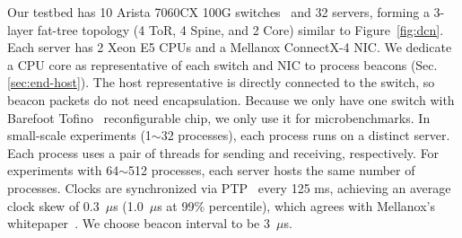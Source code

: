 Our testbed has 10 Arista 7060CX 100G switches~\cite{arista} and 32 servers, forming a 3-layer fat-tree topology (4 ToR, 4 Spine, and 2 Core) similar to Figure~\ref{fig:dcn}.
Each server has 2 Xeon E5 CPUs and a Mellanox ConnectX-4 NIC. %
We dedicate a CPU core as representative of each switch and NIC to process beacons (Sec.\ref{sec:end-host}). The host representative is directly connected to the switch, so beacon packets do not need encapsulation.
Because we only have one switch with Barefoot Tofino~\cite{tofino} reconfigurable chip, we only use it for microbenchmarks.
In small-scale experiments (1$\sim$32 processes), each process runs on a distinct server. Each process uses a pair of threads for sending and receiving, respectively.
For experiments with 64$\sim$512 processes, each server hosts the same number of processes.
Clocks are synchronized via PTP~\cite{correll2005design} every 125 ms, achieving an average clock skew of 0.3~$\mu$s (1.0~$\mu$s at 99\% percentile), which agrees with Mellanox's whitepaper~\cite{mellanox-ptp}.
We choose beacon interval to be 3~$\mu$s.


\iffalse
\begin{table}[t]
\centering
{}
\caption{Network topologies for evaluation.}
\label{tab:eval-topology}
\end{table}


